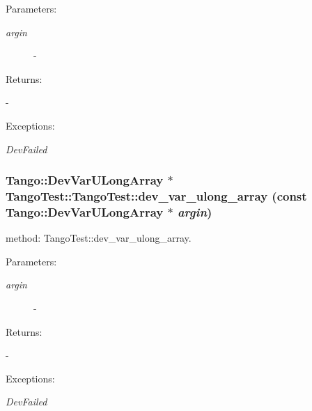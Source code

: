 \begin{Desc}
\item[Parameters: ]\par
\begin{description}
\item[{\em 
argin}]- \end{description}
\end{Desc}
\begin{Desc}
\item[Returns: ]\par
- \end{Desc}
\begin{Desc}
\item[Exceptions: ]\par
\begin{description}
\item[{\em 
Dev\-Failed}] \end{description}
\end{Desc}
\subsubsection{\setlength{\rightskip}{0pt plus 5cm}Tango::Dev\-Var\-ULong\-Array $\ast$ Tango\-Test::Tango\-Test::dev\_\-var\_\-ulong\_\-array (const Tango::Dev\-Var\-ULong\-Array $\ast$ {\em argin})}\label{classTangoTest_1_1TangoTest_z5_16}


method: Tango\-Test::dev\_\-var\_\-ulong\_\-array.

\begin{Desc}
\item[Parameters: ]\par
\begin{description}
\item[{\em 
argin}]- \end{description}
\end{Desc}
\begin{Desc}
\item[Returns: ]\par
- \end{Desc}
\begin{Desc}
\item[Exceptions: ]\par
\begin{description}
\item[{\em 
Dev\-Failed}] \end{description}
\end{Desc}

